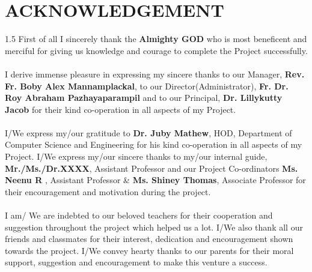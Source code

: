 \chapter*{ACKNOWLEDGEMENT}
\begin{spacing}{1.5}
First of all I sincerely thank the \textbf{Almighty GOD} who is most beneficent and merciful for giving us knowledge and courage to complete the  Project successfully.\\\\
I derive immense pleasure in expressing my sincere thanks to our Manager, \textbf{ Rev. Fr. Boby Alex Mannamplackal}, to our Director(Administrator), \textbf{Fr. Dr. Roy Abraham Pazhayaparampil} and to our Principal, \textbf{Dr. Lillykutty Jacob} for their kind co-operation in all aspects of my Project.\\\\
I/We express my/our gratitude to \textbf{Dr. Juby Mathew}, HOD, Department of Computer Science and Engineering for his kind co-operation in all aspects of my Project. I/We express my/our  sincere thanks to my/our internal guide, \textbf{Mr./Ms./Dr.XXXX}, Assistant Professor  and our Project  Co-ordinators \textbf{Ms. Neenu R }, Assistant Professor \& \textbf{Ms. Shiney Thomas}, Associate Professor for their encouragement and motivation during the project.\\\\
I am/ We are  indebted to our beloved teachers for their cooperation and suggestion throughout the project which helped us a lot. I/We also thank all our friends and classmates for their interest, dedication and encouragement shown towards the project. I/We convey hearty thanks to our parents for their moral support, suggestion and encouragement to make this venture a success.


\end{spacing}

